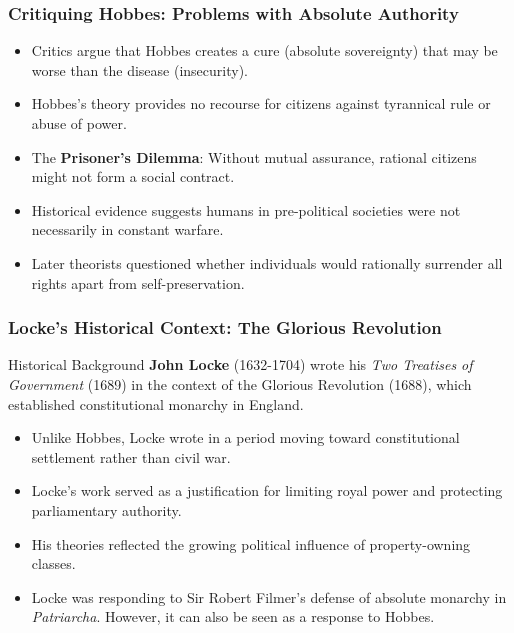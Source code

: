 \documentclass[aspectratio=169]{beamer}
\begin{document}
\begin{frame}
  \frametitle{Critiquing Hobbes: Problems with Absolute Authority}
  
  \begin{itemize}
    \item Critics argue that Hobbes creates a cure (absolute sovereignty) that may be worse than the disease (insecurity).
    \item Hobbes's theory provides no recourse for citizens against tyrannical rule or abuse of power.
    \item The \textbf{Prisoner's Dilemma}: Without mutual assurance, rational citizens might not form a social contract.
    \item Historical evidence suggests humans in pre-political societies were not necessarily in constant warfare.
    \item Later theorists questioned whether individuals would rationally surrender all rights apart from self-preservation.
  \end{itemize}
\end{frame}

\begin{frame}
  \frametitle{Locke's Historical Context: The Glorious Revolution}
  
  \begin{alertblock}{Historical Background}
    \textbf{John Locke} (1632-1704) wrote his \textit{Two Treatises of Government} (1689) in the context of the Glorious Revolution (1688), which established constitutional monarchy in England.
  \end{alertblock}
  
  \begin{itemize}
    \item Unlike Hobbes, Locke wrote in a period moving toward constitutional settlement rather than civil war.
    \item Locke's work served as a justification for limiting royal power and protecting parliamentary authority.
    \item His theories reflected the growing political influence of property-owning classes.
    \item Locke was responding to Sir Robert Filmer's defense of absolute monarchy in \textit{Patriarcha}. However, it can also be seen as a response to Hobbes.
  \end{itemize}
\end{frame}
\end{document}
